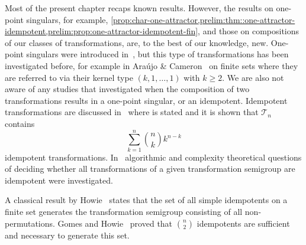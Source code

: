 Most of the present chapter recaps known results.
However, the results on one-point singulars,
for example, \cref{prop:char-one-attractor,prelim:thm::one-attractor-idempotent,prelim:prop:one-attractor-idempotent-fin},
and those on compositions of 
our classes of transformations, are, to the best of our knowledge, new.
One-point singulars were introduced
in~\cite{Rystsov2024}, but this type of transformations
has been investigated before,
for example in Ara\'ujo \& Cameron~\cite{AraujoCameron2014} on finite sets  where
they are referred to via their kernel type $(k,1,\ldots,1)$ with $k \ge 2$.
We are also not aware of any studies that investigated
when the composition of two transformations results in a one-point singular,
or an idempotent. Idempotent transformations are discussed in~\cite[Sec.~2.7]{GanyushkinMazorchuk2008} 
where  is stated
and it is shown that $\mathcal T_n$ contains 
\[
\sum_{k=1}^n \binom{n}{k} k^{n - k}
\]
idempotent transformations. In~\cite{Beaudry1989CharacterizationIdempotentTM} 
algorithmic and complexity theoretical questions of deciding
whether all transformations of a given transformation semigroup
are idempotent were investigated.

A classical result by 
Howie~\cite{Howie66} states that the set of all simple idempotents on a finite set
generates the transformation semigroup consisting of all non-permutations.
Gomes and Howie~\cite{GomesHowie1987} 
proved that $\binom{n}{2}$ idempotents are sufficient and necessary
to generate this set.